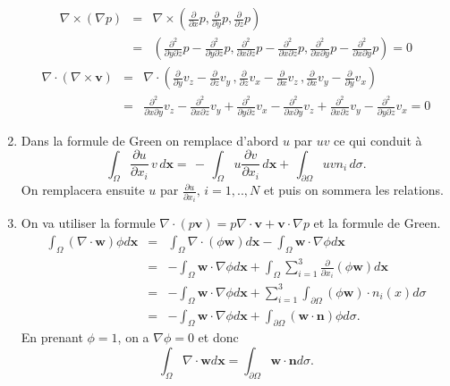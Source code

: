 \documentclass[12pt,a4paper]{article}
\newcommand{\dxx}{\frac{\partial}{\partial x}}
\newcommand{\dxy}{\frac{\partial }{\partial y}}
\newcommand{\dxz}{\frac{\partial}{\partial z}}
\newcommand{\dxi}{\frac{\partial}{\partial x_i}}
\newcommand{\Dxy}{\frac{\partial^2}{\partial x \partial y}}
\newcommand{\Dxz}{\frac{\partial^2}{\partial x \partial z}}
\newcommand{\Dyz}{\frac{\partial^2}{\partial y \partial z}}
\begin{document}
\begin{enumerate}
$$
\begin{array}{ccl}\nabla\times (\nabla p)&=&\nabla\times (\dxx p,\dxy p, \dxz p)\\
	&=& (\Dyz p-\Dyz p,\Dxz p-\Dxz p,\Dxy p -\Dxy p)=0
	\end{array}
$$
 $$
\begin{array}{ccl}
	\nabla \cdot (\nabla \times \mathbf{v})&=& \nabla \cdot (\dxy v_z-\dxz v_y\, ,\dxz v_x -\dxx v_z\, , \dxx v_y -\dxy v_x)\\
	&=& \Dxy v_z -\Dxz v_y +\Dyz v_x -\Dxy v_z+\Dxz v_y -\Dyz v_x=0
	\end{array}
$$
\item Dans la formule de Green on remplace d'abord $u$  par $uv$ ce qui conduit
  \`a 
$$
\int_\Omega \frac{\partial u}{\partial x_i}  \, v \, d\mathbf{x}= \, - \, \int_\Omega 
u \frac{\partial v}{\partial x_i}\,d\mathbf{x}+ \, \int_{\partial \Omega}
u v n_i \, d\sigma.
$$
On remplacera ensuite $u$ par $\frac{\partial u}{\partial x_i},\,
i=1,..,N$ et puis on sommera les relations. 
\item On va utiliser la formule $\nabla\cdot (p\mathbf{v})=p\nabla
  \cdot \mathbf{v}+\mathbf{v}\cdot \nabla p$ et la formule de Green.
$$\begin{array}{ccl}
	\int_{\Omega}(\nabla\cdot \mathbf{w})\phi d\mathbf{x}&=&\int_{\Omega}\nabla\cdot(\phi \mathbf{w})d\mathbf{x}-\int_{\Omega}\mathbf{w}\cdot \nabla \phi d\mathbf{x}\\
	&=& -\int_{\Omega} \mathbf{w}\cdot \nabla \phi d\mathbf{x}+\int_{\Omega}\sum_{i=1}^3 \dxi (\phi \mathbf{w})d\mathbf{x}\\
&=& -\int_{ \Omega} \mathbf{w}\cdot \nabla \phi d \mathbf{x} +\sum_{i=1}^3 \int_{\partial \Omega} (\phi \mathbf{w} )\cdot n_i(x) d \sigma\\
	&=& -\int_{\Omega} \mathbf{w} \cdot \nabla \phi d\mathbf{x}+\int_{\partial\Omega}(\mathbf{w}\cdot \mathbf{n})\phi d\sigma.
	\end{array}
$$
En prenant $\phi=1$, on a $\nabla \phi =0 $ et donc
	$$\int_{\Omega}\nabla\cdot
        \mathbf{w}d\mathbf{x}=\int_{\partial\Omega}\mathbf{w}\cdot
        \mathbf{n} d\sigma.$$


\end{enumerate}
\end{document}
